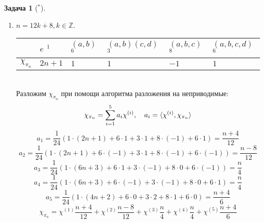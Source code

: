 \documentclass[12pt]{article}
\theoremstyle{definition}
\newtheorem{zad}{Задача}[section]
\begin{document}
\begin{zad}[$^*$]
\begin{itemize}
\begin{enumerate}
    \item $n=12k+8,k\in\mathbb{Z}$.
    \begin{table}[h!]
    \centering
    \begin{tabular}{|l|l|l|l|l|l|}
    \hline
     & $e$ $^1$ & $(a,b)$ $^6$ & $(a,b)(c,d)$ $^3$ & $(a,b,c)$ $^8$ & $(a,b,c,d)$ $^6$ \\ \hline
    $\chi_{\pi_n}$ & $2n+1$ & $1$ & $1$ & $-1$ & $1$ \\ \hline
    \end{tabular}
    \end{table}\\
    Разложим $\chi_{\pi_n}$ при помощи алгоритма разложения на неприводимые:
    \begin{equation}
        \chi_{\pi_n}=\sum\limits_{i=1}^5 a_i\chi^{(i)},\quad a_i=\braket{\chi^{(i)},\chi_{\pi_n}}
    \end{equation}
    \begin{equation}
        a_1=\frac{1}{24}(1\cdot(2n+1)+6\cdot1+3\cdot1+8\cdot(-1)+6\cdot1)=\frac{n+4}{12}
    \end{equation}
    \begin{equation}
        a_2=\frac{1}{24}(1\cdot(2n+1)+6\cdot(-1)+3\cdot1+8\cdot(-1)+6\cdot(-1))=\frac{n-8}{12}
    \end{equation}
    \begin{equation}
        a_3=\frac{1}{24}(1\cdot(6n+3)+6\cdot1+3\cdot(-1)+8\cdot0+6\cdot(-1))=\frac{n}{4}
    \end{equation}
    \begin{equation}
        a_4=\frac{1}{24}(1\cdot(6n+3)+6\cdot(-1)+3\cdot(-1)+8\cdot0+6\cdot1)=\frac{n}{4}
    \end{equation}
    \begin{equation}
        a_5=\frac{1}{24}(1\cdot(4n+2)+6\cdot0+3\cdot2+8\cdot1+6\cdot0)=\frac{n+4}{6}
    \end{equation}
    \begin{equation}
        \boxed{\chi_{\pi_n}=\chi^{(1)}\frac{n+4}{12}+\chi^{(2)}\frac{n-8}{12}+\chi^{(3)}\frac{n}{4}+\chi^{(4)}\frac{n}{4}+\chi^{(5)}\frac{n+4}{6}}
    \end{equation}
    

\end{enumerate}
\end{itemize}
\end{zad}
\end{document}
